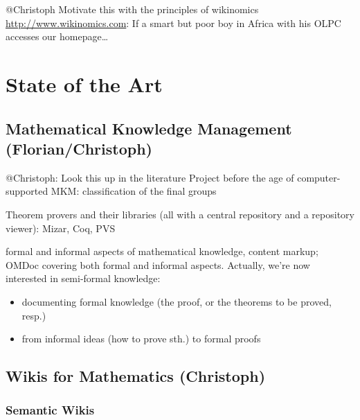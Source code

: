 \documentclass{llncs}
\begin{document}
\begin{todo}{@Christoph}
  Motivate this with the principles of wikinomics \url{http://www.wikinomics.com}: If a
  smart but poor boy in Africa with his OLPC accesses our homepage\ldots
\end{todo}

\section{State of the Art}
\label{sec:sota}

\subsection{Mathematical Knowledge Management (Florian/Christoph)}
\label{sec:mkm}

\begin{todo}{@Christoph: Look this up in the literature}
Project before the age of computer-supported MKM: classification of the final groups
\end{todo}

Theorem provers and their libraries (all with a central repository and a repository
viewer): Mizar, Coq, PVS

formal and informal aspects of mathematical knowledge, content markup; OMDoc covering both
formal and informal aspects.  Actually, we're now interested in semi-formal
knowledge:
\begin{itemize}
\item documenting formal knowledge (the proof, or the theorems to be proved, resp.)
\item from informal ideas (how to prove sth.) to formal proofs
\end{itemize}

\subsection{Wikis for Mathematics (Christoph)}
\label{sec:math-wiki}

\subsubsection{Semantic Wikis}
\label{sec:semwiki}
\end{document}
